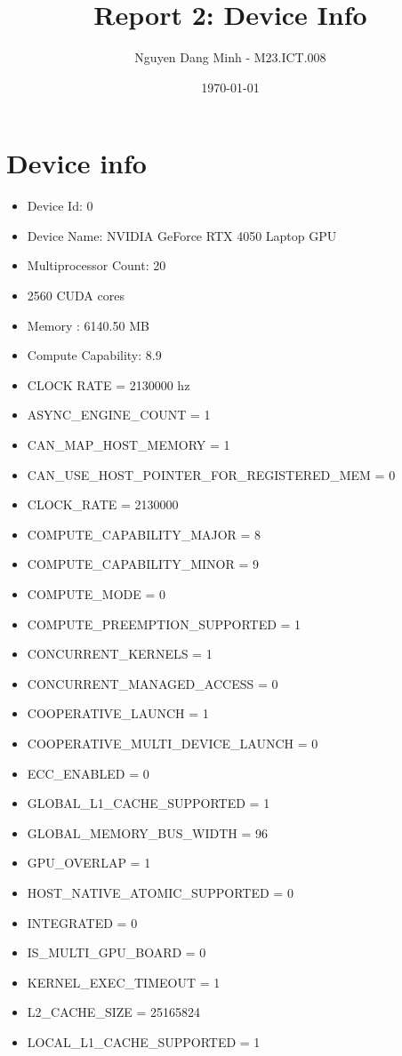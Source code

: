 \documentclass{article}
\title{Report 2: Device Info}
\author{Nguyen Dang Minh - M23.ICT.008}
\date{\today}
\begin{document}
\maketitle
\section{Device info}
\begin{itemize}
    \item Device Id: 0
    \item Device Name: NVIDIA GeForce RTX 4050 Laptop GPU
    \item Multiprocessor Count: 20
    \item 2560 CUDA cores
    \item Memory : 6140.50 MB
    \item Compute Capability: 8.9
    \item CLOCK RATE = 2130000 hz
    \item ASYNC\_ENGINE\_COUNT = 1
    \item CAN\_MAP\_HOST\_MEMORY = 1
    \item CAN\_USE\_HOST\_POINTER\_FOR\_REGISTERED\_MEM = 0
    \item CLOCK\_RATE = 2130000
    \item COMPUTE\_CAPABILITY\_MAJOR = 8
    \item COMPUTE\_CAPABILITY\_MINOR = 9
    \item COMPUTE\_MODE = 0
    \item COMPUTE\_PREEMPTION\_SUPPORTED = 1
    \item CONCURRENT\_KERNELS = 1
    \item CONCURRENT\_MANAGED\_ACCESS = 0
    \item COOPERATIVE\_LAUNCH = 1
    \item COOPERATIVE\_MULTI\_DEVICE\_LAUNCH = 0
    \item ECC\_ENABLED = 0
    \item GLOBAL\_L1\_CACHE\_SUPPORTED = 1
    \item GLOBAL\_MEMORY\_BUS\_WIDTH = 96
    \item GPU\_OVERLAP = 1
    \item HOST\_NATIVE\_ATOMIC\_SUPPORTED = 0
    \item INTEGRATED = 0
    \item IS\_MULTI\_GPU\_BOARD = 0
    \item KERNEL\_EXEC\_TIMEOUT = 1
    \item L2\_CACHE\_SIZE = 25165824
    \item LOCAL\_L1\_CACHE\_SUPPORTED = 1

\end{itemize}
\end{document}
